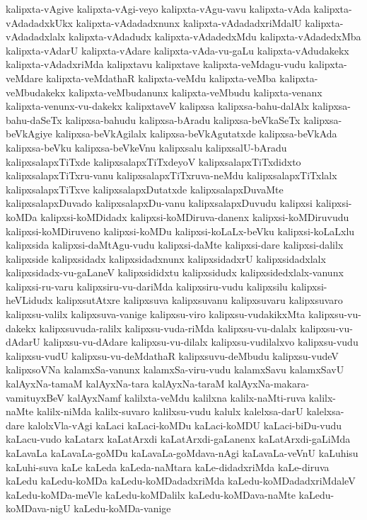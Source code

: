 {kalipxta-vAgive
kalipxta-vAgi-veyo
kalipxta-vAgu-vavu
kalipxta-vAda
kalipxta-vAdadadxkUkx
kalipxta-vAdadadxnunx
kalipxta-vAdadadxriMdalU
kalipxta-vAdadadxlalx
kalipxta-vAdadudx
kalipxta-vAdadedxMdu
kalipxta-vAdadedxMba
kalipxta-vAdarU
kalipxta-vAdare
kalipxta-vAda-vu-gaLu
kalipxta-vAdudakekx
kalipxta-vAdadxriMda
kalipxtavu
kalipxtave
kalipxta-veMdagu-vudu
kalipxta-veMdare
kalipxta-veMdathaR
kalipxta-veMdu
kalipxta-veMba
kalipxta-veMbudakekx
kalipxta-veMbudanunx
kalipxta-veMbudu
kalipxta-venanx
kalipxta-venunx-vu-dakekx
kalipxtaveV
kalipxsa
kalipxsa-bahu-dalAlx
kalipxsa-bahu-daSeTx
kalipxsa-bahudu
kalipxsa-bAradu
kalipxsa-beVkaSeTx
kalipxsa-beVkAgiye
kalipxsa-beVkAgilalx
kalipxsa-beVkAgutatxde
kalipxsa-beVkAda
kalipxsa-beVku
kalipxsa-beVkeVnu
kalipxsalu
kalipxsalU-bAradu
kalipxsalapxTiTxde
kalipxsalapxTiTxdeyoV
kalipxsalapxTiTxdidxto
kalipxsalapxTiTxru-vanu
kalipxsalapxTiTxruva-neMdu
kalipxsalapxTiTxlalx
kalipxsalapxTiTxve
kalipxsalapxDutatxde
kalipxsalapxDuvaMte
kalipxsalapxDuvado
kalipxsalapxDu-vanu
kalipxsalapxDuvudu
kalipxsi
kalipxsi-koMDa
kalipxsi-koMDidadx
kalipxsi-koMDiruva-danenx
kalipxsi-koMDiruvudu
kalipxsi-koMDiruveno
kalipxsi-koMDu
kalipxsi-koLaLx-beVku
kalipxsi-koLaLxlu
kalipxsida
kalipxsi-daMtAgu-vudu
kalipxsi-daMte
kalipxsi-dare
kalipxsi-dalilx
kalipxside
kalipxsidadx
kalipxsidadxnunx
kalipxsidadxrU
kalipxsidadxlalx
kalipxsidadx-vu-gaLaneV
kalipxsididxtu
kalipxsidudx
kalipxsidedxlalx-vanunx
kalipxsi-ru-varu
kalipxsiru-vu-dariMda
kalipxsiru-vudu
kalipxsilu
kalipxsi-heVLidudx
kalipxsutAtxre
kalipxsuva
kalipxsuvanu
kalipxsuvaru
kalipxsuvaro
kalipxsu-valilx
kalipxsuva-vanige
kalipxsu-viro
kalipxsu-vudakikxMta
kalipxsu-vu-dakekx
kalipxsuvuda-ralilx
kalipxsu-vuda-riMda
kalipxsu-vu-dalalx
kalipxsu-vu-dAdarU
kalipxsu-vu-dAdare
kalipxsu-vu-dilalx
kalipxsu-vudilalxvo
kalipxsu-vudu
kalipxsu-vudU
kalipxsu-vu-deMdathaR
kalipxsuvu-deMbudu
kalipxsu-vudeV
kalipxsoVNa
kalamxSa-vanunx
kalamxSa-viru-vudu
kalamxSavu
kalamxSavU
kalAyxNa-tamaM
kalAyxNa-tara
kalAyxNa-taraM
kalAyxNa-makara-vamituyxBeV
kalAyxNamf
kalilxta-veMdu
kalilxna
kalilx-naMti-ruva
kalilx-naMte
kalilx-niMda
kalilx-suvaro
kalilxsu-vudu
kalulx
kalelxsa-darU
kalelxsa-dare
kalolxVla-vAgi
kaLaci
kaLaci-koMDu
kaLaci-koMDU
kaLaci-biDu-vudu
kaLacu-vudo
kaLatarx
kaLatArxdi
kaLatArxdi-gaLanenx
kaLatArxdi-gaLiMda
kaLavaLa
kaLavaLa-goMDu
kaLavaLa-goMdava-nAgi
kaLavaLa-veVnU
kaLuhisu
kaLuhi-suva
kaLe
kaLeda
kaLeda-naMtara
kaLe-didadxriMda
kaLe-diruva
kaLedu
kaLedu-koMDa
kaLedu-koMDadadxriMda
kaLedu-koMDadadxriMdaleV
kaLedu-koMDa-meVle
kaLedu-koMDalilx
kaLedu-koMDava-naMte
kaLedu-koMDava-nigU
kaLedu-koMDa-vanige
}
